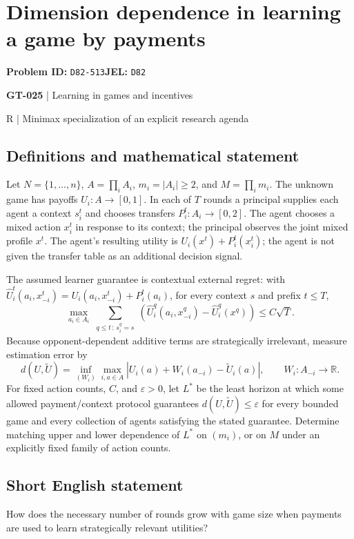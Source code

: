 \documentclass[11pt,a4paper]{article}
\begin{document}
\section*{Dimension dependence in learning a game by payments}
\textbf{Problem ID:} \texttt{D82-513}\quad \textbf{JEL:} \texttt{D82}\par
\label{problem:OP-0155}
\label{game:GT-025}
{\sffamily\small\color{muted}
{\sffamily\small\color{muted}\textbf{GT-025} | Learning in games and incentives\par R | Minimax specialization of an explicit research agenda\par}
\par}
\subsection*{Definitions and mathematical statement}
Let $N=\{1,\ldots,n\}$, $A=\prod_i A_i$, $m_i=|A_i|\geq2$, and $M=\prod_i m_i$. The unknown game has payoffs $U_i:A\to[0,1]$. In each of $T$ rounds a principal supplies each agent a context $s_i^t$ and chooses transfers $P_i^t:A_i\to[0,2]$. The agent chooses a mixed action $x_i^t$ in response to its context; the principal observes the joint mixed profile $x^t$. The agent's resulting utility is $U_i(x^t)+P_i^t(x_i^t)$; the agent is not given the transfer table as an additional decision signal.

The assumed learner guarantee is contextual external regret: with $\widehat U_i^t(a_i,x_{-i}^t)=U_i(a_i,x_{-i}^t)+P_i^t(a_i)$, for every context $s$ and prefix $t\leq T$,
\[
 \max_{a_i\in A_i}\sum_{\substack{q\leq t\, :\,s_i^q=s}}
 \left(\widehat U_i^q(a_i,x_{-i}^q)-\widehat U_i^q(x^q)\right)
 \leq C\sqrt T.
\]
Because opponent-dependent additive terms are strategically irrelevant, measure estimation error by
\[
 d(U,\widetilde U)=\inf_{(W_i)}\max_{i,a\in A}
 \left|U_i(a)+W_i(a_{-i})-\widetilde U_i(a)\right|,
 \qquad W_i:A_{-i}\to\mathbb R.
\]
For fixed action counts, $C$, and $\varepsilon>0$, let $L^*$ be the least horizon at which some allowed payment/context protocol guarantees $d(U,\widetilde U)\leq\varepsilon$ for every bounded game and every collection of agents satisfying the stated guarantee. Determine matching upper and lower dependence of $L^*$ on $(m_i)$, or on $M$ under an explicitly fixed family of action counts.
\subsection*{Short English statement}
How does the necessary number of rounds grow with game size when payments are used to learn strategically relevant utilities?
\end{document}
